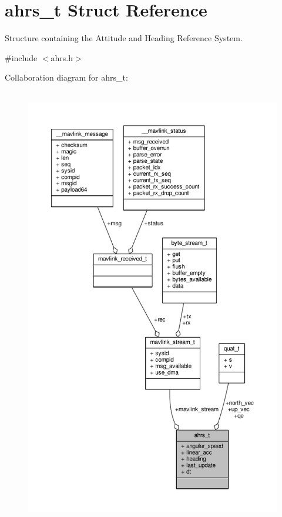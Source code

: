 \hypertarget{structahrs__t}{\section{ahrs\+\_\+t Struct Reference}
\label{structahrs__t}
}


Structure containing the Attitude and Heading Reference System.  




{\ttfamily \#include $<$ahrs.\+h$>$}



Collaboration diagram for ahrs\+\_\+t\+:
\nopagebreak
\begin{figure}[H]
\begin{center}
\leavevmode
\includegraphics[height=550pt]{structahrs__t__coll__graph}
\end{center}
\end{figure}
